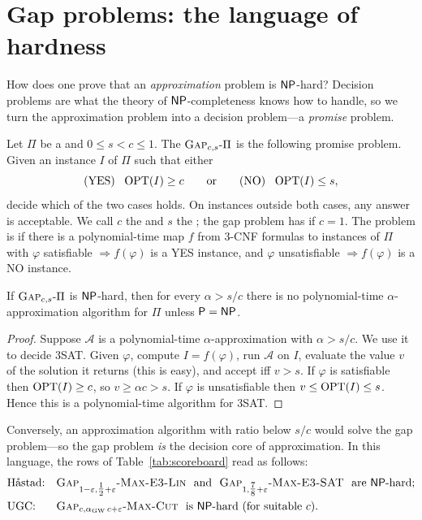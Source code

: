 \section{Gap problems: the language of hardness}
\label{sec:gap}

How does one prove that an \emph{approximation} problem is $\mathsf{NP}$-hard?  Decision problems
are what the theory of $\mathsf{NP}$-completeness knows how to handle, so we turn the approximation
problem into a decision problem---a \emph{promise} problem.

\begin{definition}\label{def:gap}
Let $\Pi$ be a  and $0\le s<c\le1$.  The 
$\textsc{Gap}_{c,s}\text{-}\textsc{$\Pi$}$ is the following promise problem.  Given an instance $I$ of $\Pi$ such that
either
\[
  \text{(YES)}\ \ \operatorname{OPT}(I)\ge c \qquad\text{or}\qquad \text{(NO)}\ \ \operatorname{OPT}(I)\le s,
\]
decide which of the two cases holds.  On instances outside both cases, any answer is acceptable.
We call $c$ the  and $s$ the ; the gap problem has
 if $c=1$.  The problem is  if there is a
polynomial-time map $f$ from $3$-CNF formulas to instances of $\Pi$ with
$\varphi$ satisfiable $\Rightarrow f(\varphi)$ is a YES instance, and $\varphi$ unsatisfiable
$\Rightarrow f(\varphi)$ is a NO instance.
\end{definition}

\begin{lemma}\label{lem:gap-approx}
If $\textsc{Gap}_{c,s}\text{-}\textsc{$\Pi$}$ is $\mathsf{NP}$-hard, then for every $\alpha>s/c$ there is no polynomial-time
$\alpha$-approximation algorithm for $\Pi$ unless $\mathsf{P}=\mathsf{NP}$.
\end{lemma}
\begin{proof}
Suppose $\mathcal A$ is a polynomial-time $\alpha$-approximation with $\alpha>s/c$.  We use it
to decide $3$SAT.  Given $\varphi$, compute $I=f(\varphi)$, run $\mathcal A$ on $I$, evaluate the
value $v$ of the solution it returns (this is easy), and accept iff $v>s$.
If $\varphi$ is satisfiable then $\operatorname{OPT}(I)\ge c$, so $v\ge\alpha c>s$.
If $\varphi$ is unsatisfiable then $v\le\operatorname{OPT}(I)\le s$.
Hence this is a polynomial-time algorithm for $3$SAT.
\end{proof}

\noindent Conversely, an approximation algorithm with ratio below $s/c$ would solve the gap
problem---so the gap problem \emph{is} the decision core of approximation.  In this language, the
rows of Table~\ref{tab:scoreboard} read as follows:
\begin{align*}
  &\text{H\aa stad:} && \Gap{1-\eps}{\tfrac12+\eps}{Max-E3-Lin}\ \text{ and }\ \Gap{1}{\tfrac78+\eps}{Max-E3-SAT}\ \text{ are $\NP$-hard};\\
  &\text{UGC:} && \Gap{c}{\alpha_{\mathrm{GW}}\, c+\eps}{Max-Cut}\ \text{ is $\NP$-hard (for suitable $c$).}
\end{align*}

